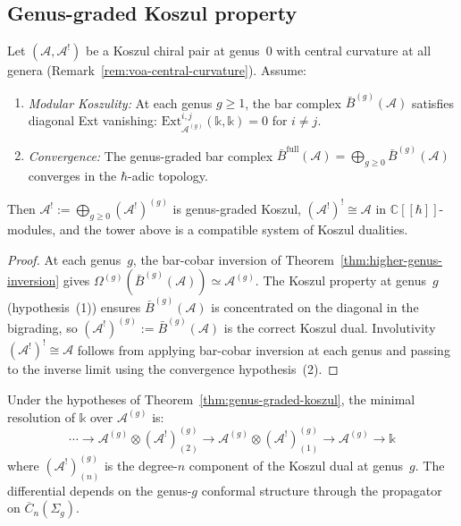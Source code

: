 \subsection{Genus-graded Koszul property}

\begin{theorem}
\label{thm:genus-graded-koszul}\label{thm:genus-graded-koszul-duality}\label{thm:extended-koszul}
Let $(\mathcal{A}, \mathcal{A}^!)$ be a Koszul chiral pair at genus~0
with central curvature at all genera (Remark~\ref{rem:voa-central-curvature}).
Assume:
\begin{enumerate}
\item \emph{Modular Koszulity:} At each genus $g \geq 1$, the bar complex
$\bar{B}^{(g)}(\mathcal{A})$ satisfies diagonal Ext vanishing:
$\mathrm{Ext}^{i,j}_{\mathcal{A}^{(g)}}(\mathbb{k}, \mathbb{k}) = 0$ for $i \neq j$.
\item \emph{Convergence:} The genus-graded bar complex
$\bar{B}^{\mathrm{full}}(\mathcal{A}) = \bigoplus_{g \geq 0} \bar{B}^{(g)}(\mathcal{A})$
converges in the $\hbar$-adic topology.
\end{enumerate}
Then $\mathcal{A}^! := \bigoplus_{g \geq 0} (\mathcal{A}^!)^{(g)}$
is genus-graded Koszul, $(\mathcal{A}^!)^! \cong \mathcal{A}$ in
$\mathbb{C}[\![\hbar]\!]$-modules, and the tower above is a compatible
system of Koszul dualities.
\end{theorem}

\begin{proof}
At each genus~$g$, the bar-cobar inversion of Theorem~\ref{thm:higher-genus-inversion}
gives $\Omega^{(g)}(\bar{B}^{(g)}(\mathcal{A})) \simeq \mathcal{A}^{(g)}$.
The Koszul property at genus~$g$ (hypothesis~(1)) ensures
$\bar{B}^{(g)}(\mathcal{A})$ is concentrated on the diagonal in the bigrading,
so $(\mathcal{A}^!)^{(g)} := \bar{B}^{(g)}(\mathcal{A})$ is the correct Koszul dual.
Involutivity $(\mathcal{A}^!)^! \cong \mathcal{A}$ follows from applying
bar-cobar inversion at each genus and passing to the inverse limit using the
convergence hypothesis~(2).
\end{proof}

\begin{lemma}
\label{lem:genus-graded-koszul-resolution}
Under the hypotheses of Theorem~\ref{thm:genus-graded-koszul}, the minimal
resolution of $\mathbb{k}$ over $\mathcal{A}^{(g)}$ is:
\[\cdots \to \mathcal{A}^{(g)} \otimes (\mathcal{A}^!)^{(g)}_{(2)}
\to \mathcal{A}^{(g)} \otimes (\mathcal{A}^!)^{(g)}_{(1)}
\to \mathcal{A}^{(g)} \to \mathbb{k}\]
where $(\mathcal{A}^!)^{(g)}_{(n)}$ is the degree-$n$ component of the
Koszul dual at genus~$g$.  The differential depends on the genus-$g$
conformal structure through the propagator on $\overline{C}_n(\Sigma_g)$.
\end{lemma}

